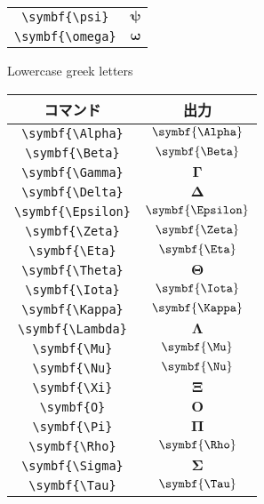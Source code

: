 \begin{table}[htbp]
\begin{subfigure}{.5\textwidth}
\begin{tabular}{cc}
            \verb|\symbf{\psi}|     & \(\symbf{\psi}\)     \\
            \verb|\symbf{\omega}|   & \(\symbf{\omega}\)   \\
            \bottomrule
        \end{tabular}
        \caption{Lowercase greek letters}
        \label{fig:greek}
    \end{subfigure}%
    \begin{subfigure}{.5\textwidth}
        \centering
        \begin{tabular}{cc}
            \toprule
            コマンド                & 出力                 \\
            \midrule
            \verb|\symbf{\Alpha}|   & \(\symbf{\Alpha}\)   \\
            \verb|\symbf{\Beta}|    & \(\symbf{\Beta}\)    \\
            \verb|\symbf{\Gamma}|   & \(\symbf{\Gamma}\)   \\
            \verb|\symbf{\Delta}|   & \(\symbf{\Delta}\)   \\
            \verb|\symbf{\Epsilon}| & \(\symbf{\Epsilon}\) \\
            \verb|\symbf{\Zeta}|    & \(\symbf{\Zeta}\)    \\
            \verb|\symbf{\Eta}|     & \(\symbf{\Eta}\)     \\
            \verb|\symbf{\Theta}|   & \(\symbf{\Theta}\)   \\
            \verb|\symbf{\Iota}|    & \(\symbf{\Iota}\)    \\
            \verb|\symbf{\Kappa}|   & \(\symbf{\Kappa}\)   \\
            \verb|\symbf{\Lambda}|  & \(\symbf{\Lambda}\)  \\
            \verb|\symbf{\Mu}|      & \(\symbf{\Mu}\)      \\
            \verb|\symbf{\Nu}|      & \(\symbf{\Nu}\)      \\
            \verb|\symbf{\Xi}|      & \(\symbf{\Xi}\)      \\
            \verb|\symbf{O}|        & \(\symbf{O}\)        \\
            \verb|\symbf{\Pi}|      & \(\symbf{\Pi}\)      \\
            \verb|\symbf{\Rho}|     & \(\symbf{\Rho}\)     \\
            \verb|\symbf{\Sigma}|   & \(\symbf{\Sigma}\)   \\
            \verb|\symbf{\Tau}|     & \(\symbf{\Tau}\)     \\

\end{tabular}
\end{subfigure}
\end{table}
